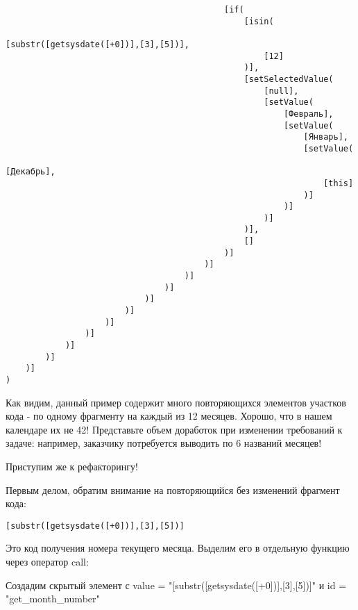 \documentclass[10pt]{book}
\begin{document}
\begin{verbatim}
                                            [if(
                                                [isin(
                                                    [substr([getsysdate([+0])],[3],[5])],
                                                    [12]
                                                )],
                                                [setSelectedValue(
                                                    [null],
                                                    [setValue(
                                                        [Февраль],
                                                        [setValue(
                                                            [Январь],
                                                            [setValue(
                                                                [Декабрь],
                                                                [this]
                                                            )]
                                                        )]
                                                    )]
                                                )],
                                                []
                                            )]
                                        )]
                                    )]
                                )]
                            )]
                        )]
                    )]
                )]
            )]
        )]
    )]
)
\end{verbatim}

Как видим, данный пример содержит много повторяющихся элементов участков кода - по одному фрагменту на каждый из 12 месяцев. Хорошо, что в нашем календаре их не 42! Представьте объем доработок при изменении требований к задаче: например, заказчику потребуется выводить по 6 названий месяцев!

Приступим же к рефакторингу!

Первым делом, обратим внимание на повторяющийся без изменений фрагмент кода:

\begin{verbatim}
[substr([getsysdate([+0])],[3],[5])]
\end{verbatim}

Это код получения номера текущего месяца. Выделим его в отдельную функцию через оператор call:

Создадим скрытый элемент с value = "[substr([getsysdate([+0])],[3],[5])]" и id = "get_month_number"
	
\end{document}
